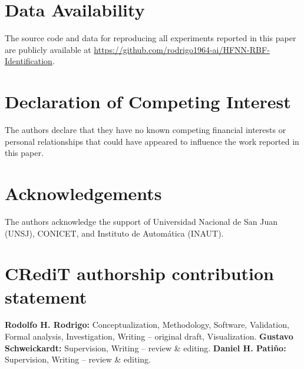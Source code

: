 \documentclass[preprint,12pt]{elsarticle}
\begin{document}
\section*{Data Availability}
The source code and data for reproducing all experiments reported in this paper are publicly available at \url{https://github.com/rodrigo1964-ai/HFNN-RBF-Identification}.

\section*{Declaration of Competing Interest}
The authors declare that they have no known competing financial interests or personal relationships that could have appeared to influence the work reported in this paper.

\section*{Acknowledgements}
The authors acknowledge the support of Universidad Nacional de San Juan (UNSJ), CONICET, and Instituto de Autom\'atica (INAUT).

\section*{CRediT authorship contribution statement}
\textbf{Rodolfo H. Rodrigo:} Conceptualization, Methodology, Software, Validation, Formal analysis, Investigation, Writing -- original draft, Visualization. \textbf{Gustavo Schweickardt:} Supervision, Writing -- review \& editing. \textbf{Daniel H. Pati\~no:} Supervision, Writing -- review \& editing.




\end{document}
